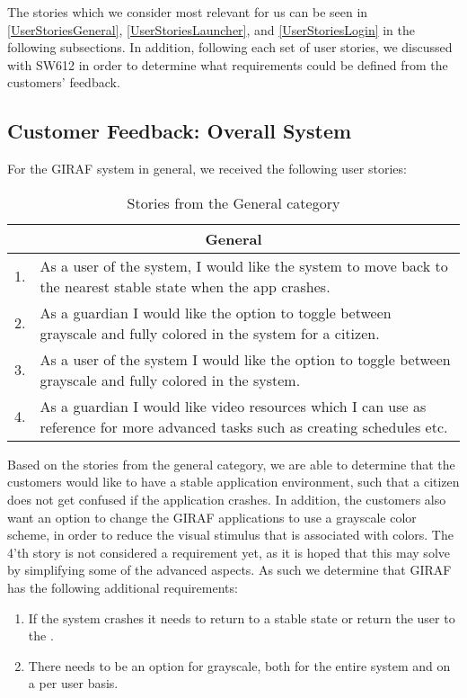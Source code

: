 The stories which we consider most relevant for us can be seen in
\autoref{UserStoriesGeneral}, \autoref{UserStoriesLauncher}, and
\autoref{UserStoriesLogin} in the following subsections. In addition, following
each set of user stories, we discussed with SW612 in order to determine what
requirements could be defined from the customers' feedback.

\subsection{Customer Feedback: Overall System}
For the GIRAF system in general, we received the following user
stories:
\begin{table}[H]
\begin{tabular}{|c|p{12.5cm}|}
\hline 
\multicolumn{2}{|c|}{General}\\\hline
1. & As a user of the system, I would like the system to move back to the
nearest stable state when the app crashes.\\\hline
2. & As a guardian I would like the option to toggle between grayscale and fully
colored in the system for a citizen. \\ \hline
3. & As a user of the system I would like the option to toggle between grayscale
and fully colored in the system. \\\hline
4. & As a guardian I would like video resources which I can use as reference for
more advanced tasks such as creating schedules etc.\\\hline
\end{tabular}
\caption{Stories from the General category}
\label{UserStoriesGeneral}
\end{table}

Based on the stories from the general category, we are able to determine that
the customers would like to have a stable application environment, such that a
citizen does not get confused if the application crashes. In addition, the
customers also want an option to change the GIRAF applications to use a
grayscale color scheme, in order to reduce the visual stimulus that is associated with colors.
The 4'th story is not considered a requirement yet, as it is hoped that this may
solve by simplifying some of the advanced aspects. As such we determine that
GIRAF has the following additional requirements:
\begin{enumerate}
  \item If the system crashes it needs to return to a stable state or return the
  user to the .
  \item There needs to be an option for grayscale, both for the entire system
  and on a per user basis.
\end{enumerate}

